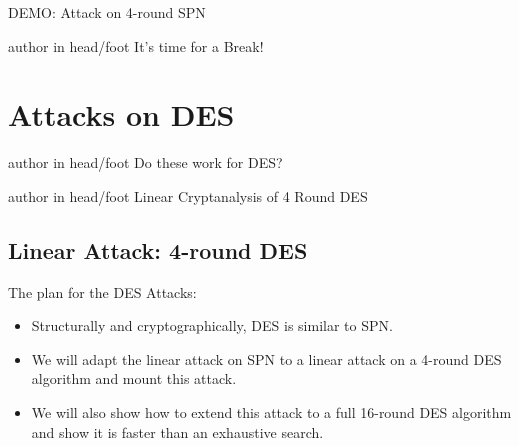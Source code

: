 \documentclass[9pt]{beamer}
\begin{document}
\begin{frame}
DEMO: Attack on 4-round SPN
\end{frame}

\begin{frame}
\begin{beamercolorbox}[ht=2.5ex,dp=1.125ex,center,rounded=true,shadow=true]{author in head/foot}
It's time for a Break!
\end{beamercolorbox}
\end{frame}


\section{Attacks on DES}
\begin{frame}
\begin{beamercolorbox}[ht=2.5ex,dp=1.125ex,center,rounded=true,shadow=true]{author in head/foot}
Do these work for DES?
\end{beamercolorbox}
\end{frame}

\begin{frame}
\begin{beamercolorbox}[ht=2.5ex,dp=1.125ex,center,rounded=true,shadow=true]{author in head/foot}
Linear Cryptanalysis of 4 Round DES
\end{beamercolorbox}
\end{frame}

\subsection{Linear Attack: 4-round DES}
\begin{frame}
The plan for the DES Attacks:
\begin{itemize}[<+->]
\item{Structurally and cryptographically, DES is similar to SPN.}
\item{We will adapt the linear attack on SPN to a linear attack on a 4-round DES algorithm and mount this attack.}
\item{We will also show how to extend this attack to a full 16-round DES algorithm and show it is faster than an exhaustive search.}
\end{itemize}
\end{frame}
\end{document}
